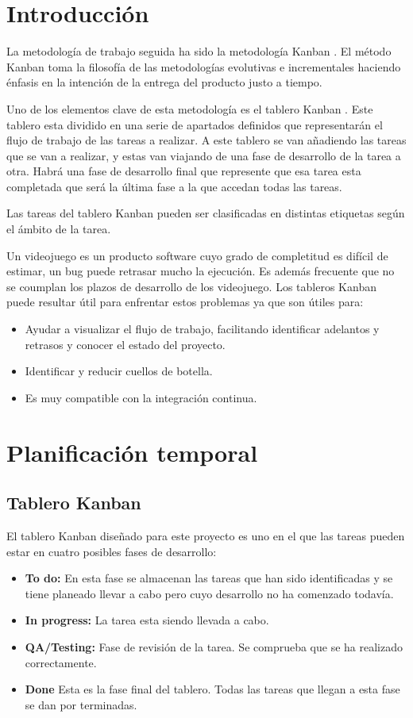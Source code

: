 
\section{Introducción}
La metodología de trabajo seguida ha sido la metodología Kanban \cite{wiki:Kanban}. El método Kanban toma la filosofía de las metodologías evolutivas e incrementales haciendo énfasis en la intención de la entrega del producto justo a tiempo.

Uno de los elementos clave de esta metodología es el tablero Kanban \cite{TableroKanban}. Este tablero esta dividido en una serie de apartados definidos que representarán el flujo de trabajo de las tareas a realizar. A este tablero se van añadiendo las tareas que se van a realizar, y estas van viajando de una fase de desarrollo de la tarea a otra. Habrá una fase de desarrollo final que represente que esa tarea esta completada que será la última fase a la que accedan todas las tareas.

Las tareas del tablero Kanban pueden ser clasificadas en distintas etiquetas según el ámbito de la tarea.

Un videojuego es un producto software cuyo grado de completitud es difícil de estimar, un bug puede retrasar mucho la ejecución. Es además frecuente que no se coumplan los plazos de desarrollo de los videojuego. Los tableros Kanban puede resultar útil para enfrentar estos problemas ya que son útiles para:
\begin{itemize}
\item
Ayudar a visualizar el flujo de trabajo, facilitando identificar adelantos y retrasos y conocer el estado del proyecto.
\item
Identificar y reducir cuellos de botella.
\item
Es muy compatible con la integración continua.
\end{itemize}

\section{Planificación temporal}
\subsection{Tablero Kanban}
El tablero Kanban diseñado para este proyecto es uno en el que las tareas pueden estar en cuatro posibles fases de desarrollo:
\begin{itemize}
\item
\textbf{To do:} En esta fase se almacenan las tareas que han sido identificadas y se tiene planeado llevar a cabo pero cuyo desarrollo no ha comenzado todavía.
\item
\textbf{In progress:} La tarea esta siendo llevada a cabo.
\item
\textbf{QA/Testing:} Fase de revisión de la tarea. Se comprueba que se ha realizado correctamente.
\item
\textbf{Done} Esta es la fase final del tablero. Todas las tareas que llegan a esta fase se dan por terminadas.
\end{itemize} 

